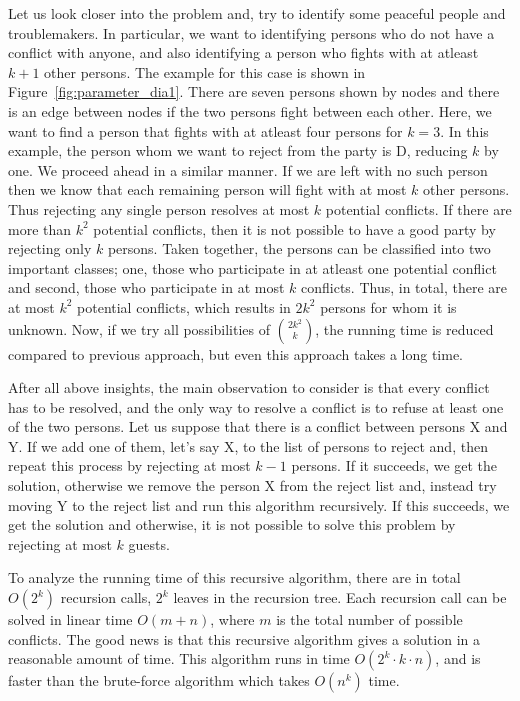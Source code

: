 Let us look closer into the problem and, try to identify some peaceful people and troublemakers.
In particular, we want to identifying persons who do not have a conflict with anyone, and also identifying a person who fights with at atleast $k+1$ other persons.
The example for this case is shown in Figure~\ref{fig:parameter_dia1}. 
There are seven persons shown by nodes and there is an edge between nodes if the two persons fight between each other.
Here, we want to find a person that fights with at atleast four persons for $k=3$. In this example, the person whom we want to reject from the party is D, reducing $k$ by one.
We proceed ahead in a similar manner. If we are left with no such person then we know that each remaining person will fight with at most $k$ other persons.
Thus rejecting any single person resolves at most $k$ potential conflicts.
If there are more than $k^2$ potential conflicts, then it is not possible to have a good party by rejecting only $k$ persons.
Taken together, the persons can be classified into two important classes; one, those who participate in at atleast one potential conflict and second, those who participate in at most $k$ conflicts. 
Thus, in total, there are at most $k^2$ potential conflicts, which results in $2k^2$ persons for whom it is unknown.
Now, if we try all possibilities of $2k^2 \choose k$, the running time is reduced compared to previous approach, but even this approach takes a long time.

After all above insights, the main observation to consider is that every conflict has to be resolved, and the only way to resolve a conflict is to refuse at least one of the two persons.
Let us suppose that there is a conflict between persons X and Y. 
If we add one of them, let's say X, to the list of persons to reject and, then repeat this process by rejecting at most $k-1$ persons.
If it succeeds, we get the solution, otherwise we remove the person X from the reject list and, instead try moving Y to the reject list and run this algorithm recursively.
If this succeeds, we get the solution and otherwise, it is not possible to solve this problem by rejecting at most $k$ guests.

To analyze the running time of this recursive algorithm, there are in total $O(2^k)$ recursion calls, $2^k$ leaves in the recursion tree.
Each recursion call can be solved in linear time $O(m+n)$, where $m$ is the total number of possible conflicts.
The good news is that this recursive algorithm gives a solution in a reasonable amount of time.
This algorithm runs in time $O(2^k \cdot k \cdot n)$, 
and is faster than the brute-force algorithm which takes $O(n^k)$ time.


